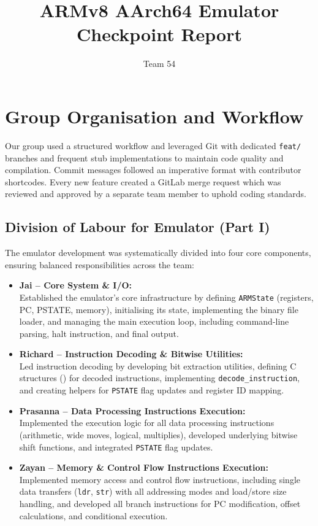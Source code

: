 \documentclass[11pt,a4paper]{article} %
\begin{document}
\title{ARMv8 AArch64 Emulator Checkpoint Report}
\author{Team 54}

\maketitle

\section{Group Organisation and Workflow}
\label{sec:group-organisation}

Our group used a structured workflow and leveraged Git with dedicated \texttt{feat/} branches and frequent stub implementations to maintain code quality and compilation. Commit messages followed an imperative format with contributor shortcodes. Every new feature created a GitLab merge request which was reviewed and approved by a separate team member to uphold coding standards.

\subsection{Division of Labour for Emulator (Part I)}
The emulator development was systematically divided into four core components, ensuring balanced responsibilities across the team:

\begin{itemize}[leftmargin=1.5em,noitemsep, itemsep=0.5em, parsep=0em]
    \item \textbf{Jai -- Core System \& I/O:}\\
    Established the emulator's core infrastructure by defining \texttt{ARMState} (registers, PC, PSTATE, memory), initialising its state, implementing the binary file loader, and managing the main execution loop, including command-line parsing, halt instruction, and final output.
    \item \textbf{Richard -- Instruction Decoding \& Bitwise Utilities:}\\
    Led instruction decoding by developing bit extraction utilities, defining C structures (\texttt{}) for decoded instructions, implementing \texttt{decode\_instruction}, and creating helpers for \texttt{PSTATE} flag updates and register ID mapping.
    \item \textbf{Prasanna -- Data Processing Instructions Execution:}\\
    Implemented the execution logic for all data processing instructions (arithmetic, wide moves, logical, multiplies), developed underlying bitwise shift functions, and integrated \texttt{PSTATE} flag updates.
    \item \textbf{Zayan -- Memory \& Control Flow Instructions Execution:}\\
    Implemented memory access and control flow instructions, including single data transfers (\texttt{ldr}, \texttt{str}) with all addressing modes and load/store size handling, and developed all branch instructions for PC modification, offset calculations, and conditional execution.
\end{itemize}
\end{document}
